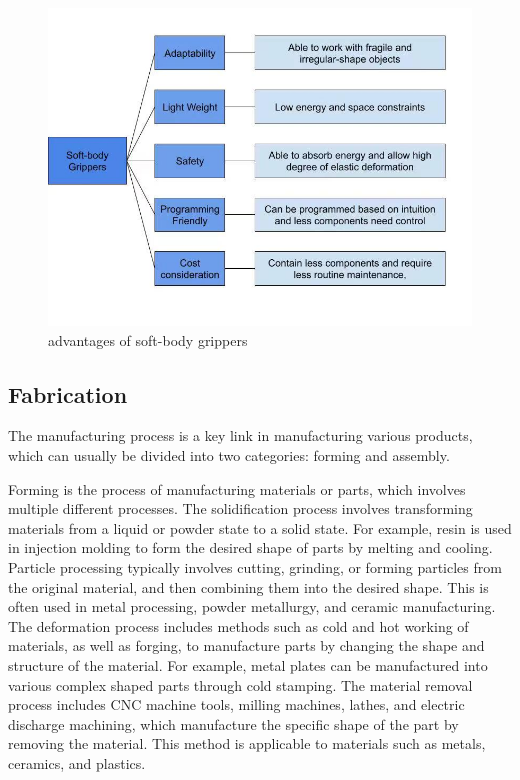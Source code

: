 \documentclass[10pt, a4paper, twocolumn]{article}
\begin{document}
\begin{figure}
    \centering
    \includegraphics[width=1\linewidth]{advantages of soft-body grippers.jpg}
    \caption{advantages of soft-body grippers}
    \label{fig:advantages of soft-body grippers}
\end{figure}

\subsection{Fabrication}
The manufacturing process is a key link in manufacturing various products, which can usually be divided into two categories: forming and assembly.

Forming is the process of manufacturing materials or parts, which involves multiple different processes. The solidification process involves transforming materials from a liquid or powder state to a solid state. For example, resin is used in injection molding to form the desired shape of parts by melting and cooling. Particle processing typically involves cutting, grinding, or forming particles from the original material, and then combining them into the desired shape. This is often used in metal processing, powder metallurgy, and ceramic manufacturing. The deformation process includes methods such as cold and hot working of materials, as well as forging, to manufacture parts by changing the shape and structure of the material. For example, metal plates can be manufactured into various complex shaped parts through cold stamping. The material removal process includes CNC machine tools, milling machines, lathes, and electric discharge machining, which manufacture the specific shape of the part by removing the material. This method is applicable to materials such as metals, ceramics, and plastics.
\end{document}
